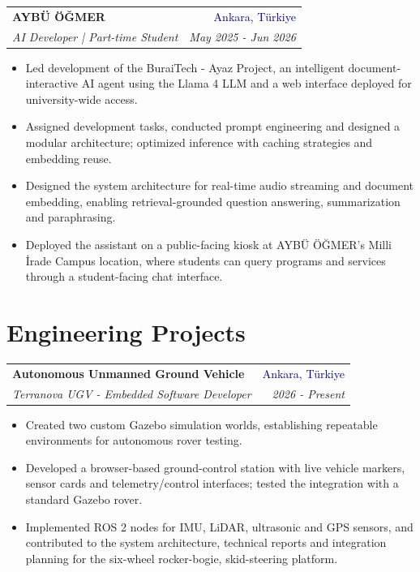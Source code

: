 \documentclass[10pt,letterpaper]{article}
\makeatletter
\newif\ifallcv
\newcommand{\entry}[4]{%
  \begin{tabularx}{\textwidth}{@{}Xr@{}}
    \textbf{#1} & \textcolor{navy}{#2}\\
    \textit{#3} & \textit{#4}
  \end{tabularx}\vspace{1pt}}
\makeatother
\begin{document}
\entry{AYBÜ ÖĞMER}{Ankara, Türkiye}
      {AI Developer | Part-time Student}{May 2025 - Jun 2026}
\begin{itemize}
  \item Led development of the BuraiTech - Ayaz Project, an intelligent document-interactive AI agent using the Llama 4 LLM and a web interface deployed for university-wide access.
  \item Assigned development tasks, conducted prompt engineering and designed a modular architecture; optimized inference with caching strategies and embedding reuse.
  \item Designed the system architecture for real-time audio streaming and document embedding, enabling retrieval-grounded question answering, summarization and paraphrasing.
  \item Deployed the assistant on a public-facing kiosk at AYBÜ ÖĞMER's Milli İrade Campus location, where students can query programs and services through a student-facing chat interface.
\end{itemize}
\vspace{2pt}

\ifallcv
  \Needspace{7\baselineskip}
  \entry{Ankara Yıldırım Beyazıt University}{Ankara, Türkiye}
        {Bootcamp Tutor \& Student Mentor}{Aug 2024 - May 2025}
  \begin{itemize}
    \item Led a summer bootcamp introducing university students to front-end web development with HTML and CSS, supporting participants as they built functional websites.
    \item Provided technical support and mentorship to engineering freshmen through the ``Meet Your Student Tech Staff'' program.
    \item Represented the university at international conferences and supported the Learning and Teaching Center's technology-focused activities.
  \end{itemize}
  \vspace{2pt}
\fi

\section{Engineering Projects}
\entry{Autonomous Unmanned Ground Vehicle}{Ankara, Türkiye}
      {Terranova UGV - Embedded Software Developer}{2026 - Present}
\begin{itemize}
  \item Created two custom Gazebo simulation worlds, establishing repeatable environments for autonomous rover testing.
  \item Developed a browser-based ground-control station with live vehicle markers, sensor cards and telemetry/control interfaces; tested the integration with a standard Gazebo rover.
  \item Implemented ROS 2 nodes for IMU, LiDAR, ultrasonic and GPS sensors, and contributed to the system architecture, technical reports and integration planning for the six-wheel rocker-bogie, skid-steering platform.
\end{itemize}
\end{document}
